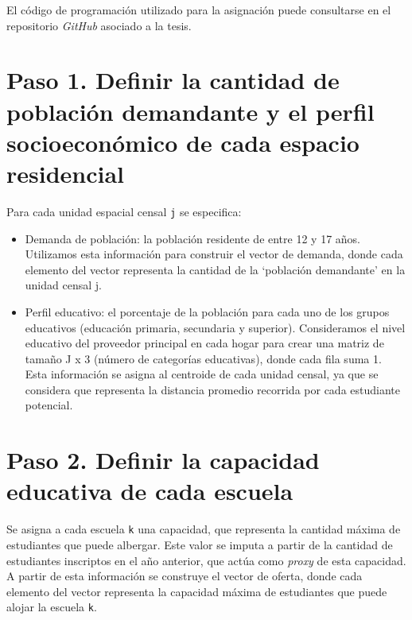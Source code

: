 \documentclass[
  spanish,
  a4paper,%
  chapterprefix=true,%
  DIV=calc,%
  twoside]{scrbook}%
\newcommand{\passthrough}[1]{#1}
\providecommand{\tightlist}{%
  \setlength{\itemsep}{0pt}\setlength{\parskip}{0pt}}
\begin{document}
El código de programación utilizado para la asignación puede consultarse en el repositorio \emph{GitHub} asociado a la tesis.

\section*{Paso 1. Definir la cantidad de población demandante y el perfil socioeconómico de cada espacio residencial}\label{paso-1.-definir-la-cantidad-de-poblaciuxf3n-demandante-y-el-perfil-socioeconuxf3mico-de-cada-espacio-residencial}

Para cada unidad espacial censal \passthrough{\lstinline!j!} se especifica:

\begin{itemize}
\tightlist
\item
  Demanda de población: la población residente de entre 12 y 17 años. Utilizamos esta información para construir el vector de demanda, donde cada elemento del vector representa la cantidad de la `población demandante' en la unidad censal j.
\item
  Perfil educativo: el porcentaje de la población para cada uno de los grupos educativos (educación primaria, secundaria y superior). Consideramos el nivel educativo del proveedor principal en cada hogar para crear una matriz de tamaño J x 3 (número de categorías educativas), donde cada fila suma 1. Esta información se asigna al centroide de cada unidad censal, ya que se considera que representa la distancia promedio recorrida por cada estudiante potencial.
\end{itemize}

\section*{Paso 2. Definir la capacidad educativa de cada escuela}\label{paso-2.-definir-la-capacidad-educativa-de-cada-escuela}

Se asigna a cada escuela \passthrough{\lstinline!k!} una capacidad, que representa la cantidad máxima de estudiantes que puede albergar. Este valor se imputa a partir de la cantidad de estudiantes inscriptos en el año anterior, que actúa como \emph{proxy} de esta capacidad. A partir de esta información se construye el vector de oferta, donde cada elemento del vector representa la capacidad máxima de estudiantes que puede alojar la escuela \passthrough{\lstinline!k!}.
\end{document}
